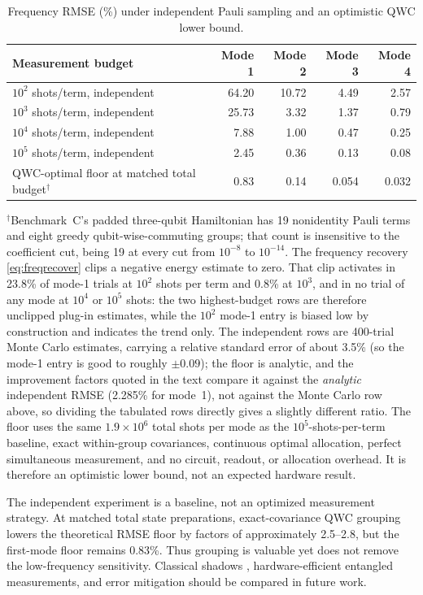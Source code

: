 \documentclass{ieeeaccess}
\begin{document}
\begin{table}[t]
\centering
\caption{Frequency RMSE (\%) under independent Pauli sampling and an optimistic QWC lower bound.}
\label{tab:shotfreq}
\begin{tabular}{lrrrr}
\toprule
Measurement budget & Mode 1 & Mode 2 & Mode 3 & Mode 4\\
\midrule
$10^2$ shots/term, independent & 64.20 & 10.72 & 4.49 & 2.57\\
$10^3$ shots/term, independent & 25.73 & 3.32 & 1.37 & 0.79\\
$10^4$ shots/term, independent & 7.88 & 1.00 & 0.47 & 0.25\\
$10^5$ shots/term, independent & 2.45 & 0.36 & 0.13 & 0.08\\
\midrule
QWC-optimal floor at matched total budget$^{\dagger}$ & 0.83 & 0.14 & 0.054 & 0.032\\
\bottomrule
\end{tabular}

\vspace{0.35em}
\parbox{0.97\textwidth}{\footnotesize $^{\dagger}$Benchmark~C's padded three-qubit Hamiltonian has 19 nonidentity Pauli terms and eight greedy qubit-wise-commuting groups; that count is insensitive to the coefficient cut, being 19 at every cut from $10^{-8}$ to $10^{-14}$. The frequency recovery \eqref{eq:freqrecover} clips a negative energy estimate to zero. That clip activates in 23.8\% of mode-1 trials at $10^2$ shots per term and 0.8\% at $10^3$, and in no trial of any mode at $10^4$ or $10^5$ shots: the two highest-budget rows are therefore unclipped plug-in estimates, while the $10^2$ mode-1 entry is biased low by construction and indicates the trend only. The independent rows are 400-trial Monte Carlo estimates, carrying a relative standard error of about 3.5\% (so the mode-1 entry is good to roughly $\pm0.09$); the floor is analytic, and the improvement factors quoted in the text compare it against the \emph{analytic} independent RMSE (2.285\% for mode~1), not against the Monte Carlo row above, so dividing the tabulated rows directly gives a slightly different ratio. The floor uses the same $1.9\times10^6$ total shots per mode as the $10^5$-shots-per-term baseline, exact within-group covariances, continuous optimal allocation, perfect simultaneous measurement, and no circuit, readout, or allocation overhead. It is therefore an optimistic lower bound, not an expected hardware result.}
\end{table}

The independent experiment is a baseline, not an optimized measurement strategy. At matched total state preparations, exact-covariance QWC grouping lowers the theoretical RMSE floor by factors of approximately 2.5--2.8, but the first-mode floor remains 0.83\%. Thus grouping is valuable yet does not remove the low-frequency sensitivity. Classical shadows \cite{Huang2020}, hardware-efficient entangled measurements, and error mitigation \cite{Endo2021} should be compared in future work.
\end{document}
